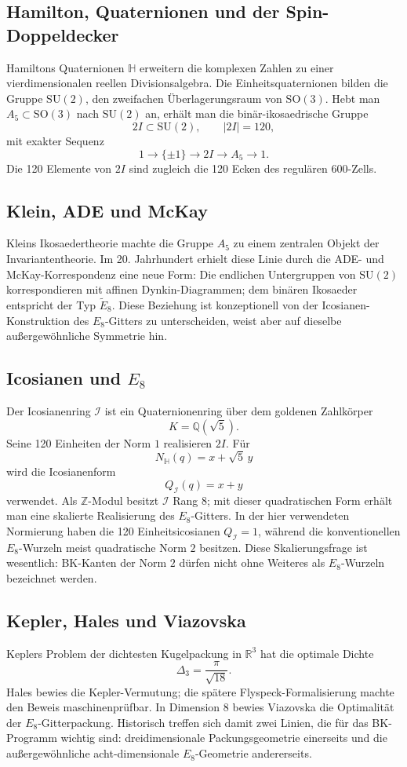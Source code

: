 \documentclass[11pt,a4paper]{article}
\theoremstyle{definition}
\theoremstyle{remark}
\newcommand{\QI}{Q_{\mathcal I}}
\newcommand{\Ico}{\mathcal I}
\newcommand{\HH}{\mathbb H}
\newcommand{\QQ}{\mathbb Q}
\newcommand{\RR}{\mathbb R}
\newcommand{\ZZ}{\mathbb Z}
\newcommand{\twoI}{2I}
\begin{document}
\subsection{Hamilton, Quaternionen und der Spin-Doppeldecker}
Hamiltons Quaternionen $\HH$ erweitern die komplexen Zahlen zu einer vierdimensionalen reellen Divisionsalgebra. Die Einheitsquaternionen bilden die Gruppe $\mathrm{SU}(2)$, den zweifachen Überlagerungsraum von $\mathrm{SO}(3)$. Hebt man $A_5\subset\mathrm{SO}(3)$ nach $\mathrm{SU}(2)$ an, erhält man die binär-ikosaedrische Gruppe
\[
\twoI\subset\mathrm{SU}(2),\qquad |\twoI|=120,
\]
mit exakter Sequenz
\[
1\to\{\pm1\}\to\twoI\to A_5\to1.
\]
Die 120 Elemente von $2I$ sind zugleich die 120 Ecken des regulären 600-Zells.

\subsection{Klein, ADE und McKay}
Kleins Ikosaedertheorie machte die Gruppe $A_5$ zu einem zentralen Objekt der Invariantentheorie. Im 20. Jahrhundert erhielt diese Linie durch die ADE- und McKay-Korrespondenz eine neue Form: Die endlichen Untergruppen von $\mathrm{SU}(2)$ korrespondieren mit affinen Dynkin-Diagrammen; dem binären Ikosaeder entspricht der Typ $\widetilde E_8$. Diese Beziehung ist konzeptionell von der Icosianen-Konstruktion des $E_8$-Gitters zu unterscheiden, weist aber auf dieselbe außergewöhnliche Symmetrie hin.

\subsection{Icosianen und $E_8$}
Der Icosianenring $\Ico$ ist ein Quaternionenring über dem goldenen Zahlkörper
\[
K=\QQ(\sqrt5).
\]
Seine 120 Einheiten der Norm $1$ realisieren $2I$. Für
\[
N_{\HH}(q)=x+\sqrt5\,y
\]
wird die Icosianenform
\[
\QI(q)=x+y
\]
verwendet. Als $\ZZ$-Modul besitzt $\Ico$ Rang $8$; mit dieser quadratischen Form erhält man eine skalierte Realisierung des $E_8$-Gitters. In der hier verwendeten Normierung haben die 120 Einheitsicosianen $\QI=1$, während die konventionellen $E_8$-Wurzeln meist quadratische Norm $2$ besitzen. Diese Skalierungsfrage ist wesentlich: BK-Kanten der Norm $2$ dürfen nicht ohne Weiteres als $E_8$-Wurzeln bezeichnet werden.

\subsection{Kepler, Hales und Viazovska}
Keplers Problem der dichtesten Kugelpackung in $\RR^3$ hat die optimale Dichte
\[
\Delta_3=\frac{\pi}{\sqrt{18}}.
\]
Hales bewies die Kepler-Vermutung; die spätere Flyspeck-Formalisierung machte den Beweis maschinenprüfbar. In Dimension $8$ bewies Viazovska die Optimalität der $E_8$-Gitterpackung. Historisch treffen sich damit zwei Linien, die für das BK-Programm wichtig sind: dreidimensionale Packungsgeometrie einerseits und die außergewöhnliche acht-dimensionale $E_8$-Geometrie andererseits.
\end{document}
